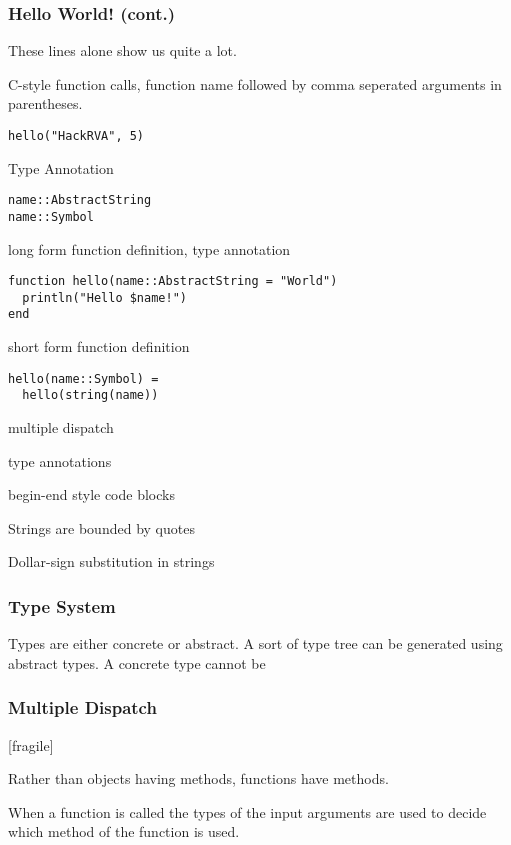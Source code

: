 \documentclass{beamer}
\begin{document}
\begin{frame}[fragile]
\frametitle{Hello World! (cont.)}

These lines alone show us quite a lot.

C-style function calls, function name followed by comma seperated arguments in 
parentheses.
\begin{verbatim}
hello("HackRVA", 5)
\end{verbatim}

Type Annotation
\begin{verbatim}
name::AbstractString
name::Symbol
\end{verbatim}

long form function definition, type annotation
\begin{verbatim}
function hello(name::AbstractString = "World")
  println("Hello $name!")
end
\end{verbatim}

short form function definition
\begin{verbatim}
hello(name::Symbol) =
  hello(string(name))
\end{verbatim}

  \item multiple dispatch
  \item type annotations
  \item begin-end style code blocks
  \item Strings are bounded by quotes

Dollar-sign substitution in strings

\end{frame}

\begin{frame}
\frametitle{Type System}

Types are either concrete or abstract. A sort of type tree can be generated
using abstract types. A concrete type cannot be 

\end{frame}

\begin{frame}
\frametitle{Multiple Dispatch}[fragile]

Rather than objects having methods, functions have methods.

When a function is called the types of the input arguments are used to decide 
which method of the function is used.

\end{frame}
\end{document}
